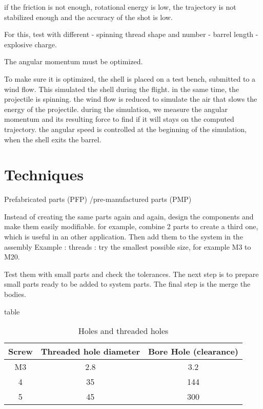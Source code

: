 \documentclass[12pt,a4paper]{article}
\begin{document}
if the friction is not enough, rotational energy is low, the trajectory is not stabilized enough and the accuracy of the shot is low. 

For this, test with different 
- spinning thread shape and number
- barrel length
- explosive charge. 

The angular momentum must be optimized.

To make sure it is optimized, the shell is placed on a test bench, submitted to a wind flow. This simulated the shell during the flight. in the same time, the projectile is spinning. 
the wind flow is reduced to simulate the air that slows the energy of the projectile. during the simulation, we measure the angular momentum and its resulting force to find if it will stays on the computed trajectory. 
the angular speed is controlled at the beginning of the simulation, when the shell exits the barrel. 

\newpage
\section{Techniques}
Prefabricated parts (PFP) /pre-manufactured parts (PMP)

Instead of creating the same parts again and again, design the components and make them easily modifiable.
for example, combine 2 parts to create a third one, which is useful in an other application. Then add them to the system in the assembly
Example : threads : try the smallest possible size, for example M3 to M20. 

Test them with small parts and check the tolerances. 
The next step is to prepare small parts ready to be added to system parts. The final step is the merge the bodies. 


table

\begin{table}[ht]
	\caption{Holes and threaded holes} %
	\centering %
	\begin{tabular}{c c c} %
		\hline\hline %
		Screw & Threaded hole diameter & Bore Hole (clearance) \\ [0.5ex] %
		\hline %
		M3 & 2.8 & 3.2 \\ %
		4 & 35 & 144 \\
		5 & 45 & 300 \\ [1ex] %
		\hline %
	\end{tabular}\label{table:nonlin} %
\end{table}
\end{document}
